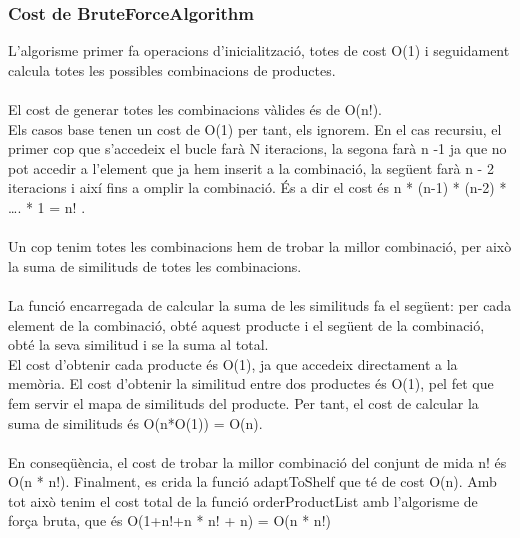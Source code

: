 \documentclass[a4paper, t]{article}
\begin{document}
\subsubsection{Cost de BruteForceAlgorithm}
L'algorisme primer fa operacions d'inicialització, totes de cost O(1) i seguidament calcula totes les possibles combinacions de productes.
\\ \\
El cost de generar totes les combinacions vàlides és de O(n!). 
\\
Els casos base tenen un cost de O(1) per  tant, els ignorem. En el cas recursiu, el primer cop que s’accedeix el bucle farà N iteracions, la segona farà n -1 ja que no pot accedir a l'element que ja hem inserit a la combinació, la següent farà n - 2 iteracions i així fins a omplir la combinació. És a dir el cost és n * (n-1) * (n-2) * …. * 1 = n! .
\\ \\
Un cop tenim totes les combinacions hem de trobar la millor combinació, per això la suma de similituds de totes les combinacions.
\\ \\
La funció encarregada de calcular la suma de les similituds fa el següent: per cada element de la combinació, obté aquest producte i el següent de la combinació, obté la seva similitud i se la suma al total.
\\
El cost d’obtenir cada producte és O(1), ja que accedeix directament a la memòria. El cost d’obtenir la similitud entre dos productes és O(1),  pel fet que fem servir el mapa de  similituds del producte. Per tant, el cost de calcular la suma de similituds és O(n*O(1)) = O(n).
\\ \\
En conseqüència, el cost de trobar la millor combinació del conjunt de mida n! és O(n * n!). Finalment, es crida la funció adaptToShelf que té de cost O(n). Amb tot això tenim el cost total de la funció orderProductList amb l’algorisme de força bruta, que és O(1+n!+n * n! + n) = O(n * n!)

\newpage
\end{document}
